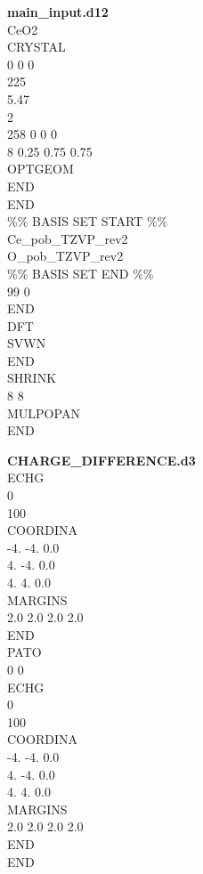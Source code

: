 \documentclass{article}
\begin{document}
\noindent\begin{minipage}[t]{0.45\textwidth}
    \textbf{main\_input.d12}
    \vspace{15pt}
	\\CeO2
	\\CRYSTAL
	\\0 0 0 
	\\225
	\\5.47
	\\2
	\\258 0 0 0
	\\8 0.25 0.75 0.75
	\\OPTGEOM
	\\END
	\\END
	\\\%\% BASIS SET START \%\%
	\\Ce\_pob\_TZVP\_rev2
	\\O\_pob\_TZVP\_rev2
	\\\%\% BASIS SET END \%\%
	\\99 0
	\\END
	\\DFT
	\\SVWN
	\\END
	\\SHRINK
	\\8 8
	\\MULPOPAN
	\\END
\end{minipage}
\hfill
\begin{minipage}[t]{0.45\textwidth}
    \textbf{CHARGE\_DIFFERENCE.d3}
    \vspace{15pt}
	\\ECHG
	\\0
	\\100
	\\COORDINA
	\\-4. -4. 0.0
	\\4. -4. 0.0
	\\4. 4. 0.0
	\\MARGINS
	\\2.0 2.0 2.0 2.0
	\\END
	\\PATO
	\\0 0
	\\ECHG
	\\0
	\\100
	\\COORDINA
	\\-4. -4. 0.0
	\\4. -4. 0.0
	\\4. 4. 0.0
	\\MARGINS
	\\2.0 2.0 2.0 2.0
	\\END
	\\END
\end{minipage}
\end{document}
